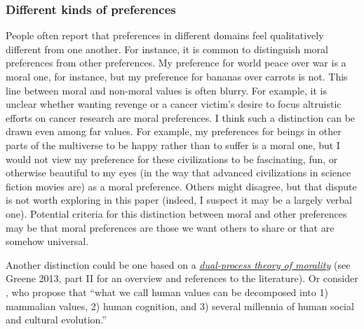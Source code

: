 \subsubsection{Different kinds of
preferences}\label{different-kinds-of-preferences}

People often report that preferences in different domains feel
qualitatively different from one another. For instance, it is common to
distinguish moral preferences from other preferences. My preference for
world peace over war is a moral one, for instance, but my preference for
bananas over carrots is not. This line between moral and non-moral
values is often blurry. For example, it is unclear whether wanting
revenge or a cancer victim's desire to focus altruistic efforts on
cancer research are moral preferences. I think such a distinction can be
drawn even among far values. For example, my preferences for beings in
other parts of the multiverse to be happy rather than to suffer is a
moral one, but I would not view my preference for these civilizations to
be fascinating, fun, or otherwise beautiful to my eyes (in the way that
advanced civilizations in science fiction movies are) as a moral
preference. Others might disagree, but that dispute is not worth
exploring in this paper (indeed, I suspect it may be a largely verbal
one). Potential criteria for this distinction between moral and other
preferences may be that moral preferences are those we want others to
share or that are somehow universal.

Another distinction could be one based on a
\href{https://en.wikipedia.org/wiki/Dual_process_theory_(moral_psychology)}{\emph{dual-process
theory of morality}} (see Greene 2013, part II for an overview and
references to the literature). Or consider
\parencite{noauthor_undated-wg}, who propose that ``what we
call human values can be decomposed into 1) mammalian values, 2) human
cognition, and 3) several millennia of human social and cultural
evolution.''

